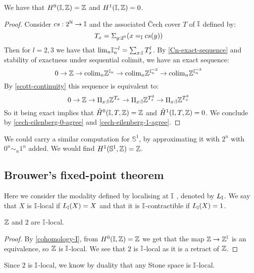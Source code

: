 \begin{proposition}\label{cohomology-I}
We have that $H^0(\mathbb{I},\mathbb{Z}) = \mathbb{Z}$ and $H^1(\mathbb{I},\mathbb{Z}) = 0$.
\end{proposition}

\begin{proof}
Consider $cs:2^{\mathbb{N}}\to\mathbb{I}$ and the associated \v{C}ech cover $T$ of $\mathbb{I}$ defined by: 
\[T_x = \Sigma_{y:2^{\mathbb{N}}} (x=_{\mathbb{I}} cs(y))\]
Then for $l=2,3$ we have that $\mathrm{lim}_n\mathbb{I}_n^{\sim l} = \sum_{x:\mathbb{I}} T_x^l$. By \cref{Cn-exact-sequence} and stability of exactness under sequential colimit, we have an exact sequence:
\[ 0\to \mathbb{Z}\to \mathrm{colim}_n \mathbb{Z}^{\mathbb{I}_n} \to \mathrm{colim}_n \mathbb{Z}^{\mathbb{I}_n^{\sim2}}\to \mathrm{colim}_n \mathbb{Z}^{\mathbb{I}_n^{\sim3}}\]
By \cref{scott-continuity} this sequence is equivalent to:
\[ 0\to \mathbb{Z}\to \Pi_{x:\mathbb{I}}\mathbb{Z}^{T_x} \to  \Pi_{x:\mathbb{I}}\mathbb{Z}^{T_x^2} \to  \Pi_{x:\mathbb{I}}\mathbb{Z}^{T_x^3}\]
So it being exact implies that $\check{H}^0(\mathbb{I},T,\mathbb{Z}) = \mathbb{Z}$ and $\check{H}^1(\mathbb{I},T,\mathbb{Z}) = 0$.
We conclude by \cref{cech-eilenberg-0-agree} and \cref{cech-eilenberg-1-agree}.
\end{proof}

\begin{remark}
We could carry a similar computation for $\mathbb{S}^1$, by approximating it with $2^n$ with $0^n\sim_n1^n$ added. We would find $H^1(\mathbb{S}^1,\mathbb{Z})=\mathbb{Z}$.
\end{remark}


\subsection{Brouwer's fixed-point theorem}

Here we consider the modality defined by localising at $\mathbb{I}$ \cite{modalities}, denoted by $L_{\mathbb{I}}$. We say that $X$ is $\mathbb{I}$-local if $L_{\mathbb{I}}(X) = X$ and that it is $\mathbb{I}$-contractible if $L_{\mathbb{I}}(X)=1$.

\begin{lemma}\label{Z-I-local}
$\mathbb{Z}$ and $2$ are $\mathbb{I}$-local.
\end{lemma}

\begin{proof}
By \cref{cohomology-I}, from $H^0(\mathbb{I},\mathbb{Z})=\mathbb{Z}$ we get that the map $\mathbb{Z}\to \mathbb{Z}^{\mathbb{I}}$ is an equivalence, so $\mathbb{Z}$ is $\mathbb{I}$-local. We see that $2$ is $\mathbb{I}$-local as it is a retract of $\mathbb{Z}$.
\end{proof}

\begin{remark}
Since $2$ is $\mathbb{I}$-local, we know by duality that any Stone space is $\mathbb{I}$-local.
\end{remark}

